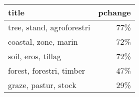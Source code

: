 \begin{tabular}{p{1.2cm}r}
\toprule
                     title &  pchange \\
\midrule
 tree, stand, agroforestri &      77\% \\
      coastal, zone, marin &      72\% \\
        soil, eros, tillag &      72\% \\
  forest, forestri, timber &      47\% \\
      graze, pastur, stock &      29\% \\
\bottomrule
\end{tabular}
